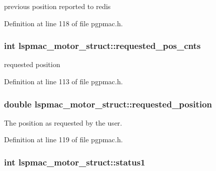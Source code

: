 previous position reported to redis 



Definition at line 118 of file pgpmac.\-h.

\hypertarget{structlspmac__motor__struct_a6e8dc9c11dc52a439fe9837230f93ce2}{
\subsubsection[{requested\-\_\-pos\-\_\-cnts}]{\setlength{\rightskip}{0pt plus 5cm}int lspmac\-\_\-motor\-\_\-struct\-::requested\-\_\-pos\-\_\-cnts}}\label{structlspmac__motor__struct_a6e8dc9c11dc52a439fe9837230f93ce2}


requested position 



Definition at line 113 of file pgpmac.\-h.

\hypertarget{structlspmac__motor__struct_af8cdc94c6e2478b12ce942d4cf1d7499}{
\subsubsection[{requested\-\_\-position}]{\setlength{\rightskip}{0pt plus 5cm}double lspmac\-\_\-motor\-\_\-struct\-::requested\-\_\-position}}\label{structlspmac__motor__struct_af8cdc94c6e2478b12ce942d4cf1d7499}


The position as requested by the user. 



Definition at line 119 of file pgpmac.\-h.

\hypertarget{structlspmac__motor__struct_acb52b612b9237e8eec0b97fb1e76a35d}{
\subsubsection[{status1}]{\setlength{\rightskip}{0pt plus 5cm}int lspmac\-\_\-motor\-\_\-struct\-::status1}}\label{structlspmac__motor__struct_acb52b612b9237e8eec0b97fb1e76a35d}


